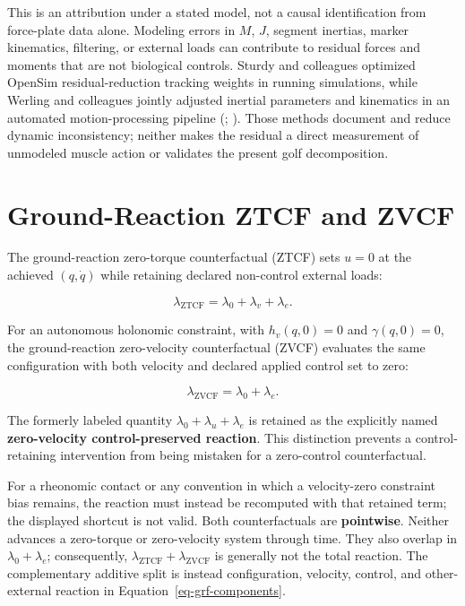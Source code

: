\documentclass[
  letterpaper,
]{report}
\begin{document}
This is an attribution under a stated model, not a causal identification
from force-plate data alone. Modeling errors in \(M\), \(J\), segment
inertias, marker kinematics, filtering, or external loads can contribute
to residual forces and moments that are not biological controls. Sturdy
and colleagues optimized OpenSim residual-reduction tracking weights in
running simulations, while Werling and colleagues jointly adjusted
inertial parameters and kinematics in an automated motion-processing
pipeline (;
). Those methods document
and reduce dynamic inconsistency; neither makes the residual a direct
measurement of unmodeled muscle action or validates the present golf
decomposition.

\section{Ground-Reaction ZTCF and
ZVCF}\label{ground-reaction-ztcf-and-zvcf}

The ground-reaction zero-torque counterfactual (ZTCF) sets \(u=0\) at
the achieved \((q,\dot q)\) while retaining declared non-control
external loads:

\[
\lambda_{\mathrm{ZTCF}}=\lambda_0+\lambda_v+\lambda_e.
\]

For an autonomous holonomic constraint, with \(h_v(q,0)=0\) and
\(\gamma(q,0)=0\), the ground-reaction zero-velocity counterfactual
(ZVCF) evaluates the same configuration with both velocity and declared
applied control set to zero:

\[
\lambda_{\mathrm{ZVCF}}=\lambda_0+\lambda_e.
\]

The formerly labeled quantity \(\lambda_0+\lambda_u+\lambda_e\) is
retained as the explicitly named \textbf{zero-velocity control-preserved
reaction}. This distinction prevents a control-retaining intervention
from being mistaken for a zero-control counterfactual.

For a rheonomic contact or any convention in which a velocity-zero
constraint bias remains, the reaction must instead be recomputed with
that retained term; the displayed shortcut is not valid. Both
counterfactuals are \textbf{pointwise}. Neither advances a zero-torque
or zero-velocity system through time. They also overlap in
\(\lambda_0+\lambda_e\); consequently,
\(\lambda_{\mathrm{ZTCF}}+\lambda_{\mathrm{ZVCF}}\) is generally not the
total reaction. The complementary additive split is instead
configuration, velocity, control, and other-external reaction in
Equation~\ref{eq-grf-components}.
\end{document}

